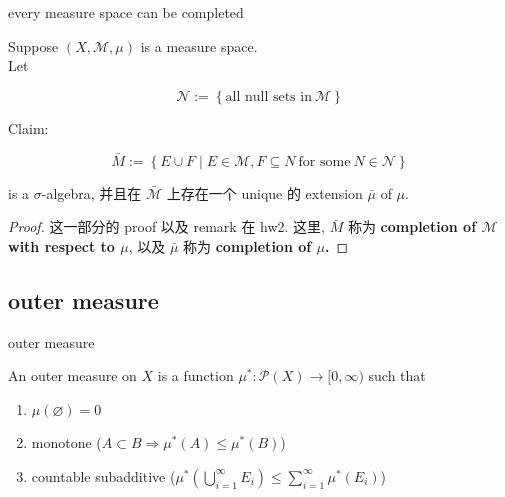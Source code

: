 \documentclass{qlnotes-export}
\begin{document}
\begin{theorem}{every measure space can be completed}\label{thm-02-outer-measure-completion-of-a-measurable-space-every-measure-space-can-be-completed}

Suppose \((X,\mathcal{M},\mu)\) is a measure space.\\
Let

\[\mathcal{N} := \left\{ {\text{all null sets in}\ \mathcal{M}} \right\}\]

Claim:

\[\bar{M} := \left\{ {E \cup F \mid E \in \mathcal{M},F \subseteq N\ \text{for some}\ N \in \mathcal{N}} \right\}\]

is a \(\sigma\)-algebra, 并且在 \(\bar{\mathcal{M}}\) 上存在一个 unique 的 extension \(\bar{\mu}\) of \(\mu\).

\end{theorem}

\begin{proof}

这一部分的 proof 以及 remark 在 hw2. 这里, \(\bar{M}\) 称为 \textbf{completion of \(\mathcal{M}\) with respect to \(\mu\)}, 以及 \(\bar{\mu}\) 称为 \textbf{completion of \(\mu\).}

\end{proof}

\subsection{outer measure}\label{outer-measure}

\begin{definition}{outer measure}\label{def-02-outer-measure-completion-of-a-measurable-space-outer-measure}

An outer measure on \(X\) is a function \(\mu^{\ast}:\mathcal{P}(X)\rightarrow\lbrack 0,\infty)\) such that

\begin{enumerate}
\item
  \(\mu(\varnothing) = 0\)
\item
  monotone (\(A \subset B\Longrightarrow\mu^{\ast}(A) \leq \mu^{\ast}(B)\))
\item
  countable subadditive (\(\mu^{\ast}(\bigcup_{i = 1}^{\infty}E_{i}) \leq \sum_{i = 1}^{\infty}\mu^{\ast}(E_{i})\))
\end{enumerate}

\end{definition}
\end{document}
